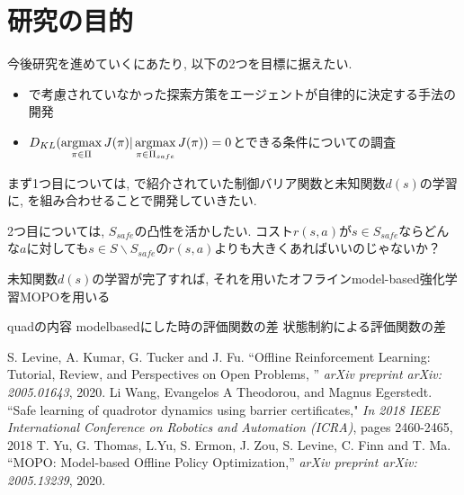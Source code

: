 \documentclass{jsarticle}
\newcommand{\argmax}{\mathop{\rm argmax}\limits}
\begin{document}
\section{研究の目的}
今後研究を進めていくにあたり, 以下の2つを目標に据えたい.
\begin{itemize}
	\item{\cite{quad}で考慮されていなかった探索方策をエージェントが自律的に決定する手法の開発}
	\item{$D_{KL}(\argmax_{\pi\in\Pi}J(\pi)|\argmax_{\pi\in\Pi_{safe}}J(\pi))=0$とできる条件についての調査}
\end{itemize}

まず1つ目については, \cite{quad}で紹介されていた制御バリア関数と未知関数$d(s)$の学習に, \cite{MOPO}を組み合わせることで開発していきたい.\par
2つ目については, $S_{safe}$の凸性を活かしたい. コスト$r(s,a)$が$s\in S_{safe}$ならどんな$a$に対しても$s\in S\backslash S_{safe}$の$r(s,a)$よりも大きくあればいいのじゃないか？\par



未知関数$d(s)$の学習が完了すれば, それを用いたオフラインmodel-based強化学習MOPOを用いる

quadの内容
modelbasedにした時の評価関数の差
状態制約による評価関数の差


\begin{thebibliography}{10}
S. Levine, A. Kumar, G. Tucker and J. Fu. “Offline Reinforcement Learning: Tutorial, Review, and Perspectives on Open Problems, ” \textit{arXiv preprint arXiv: 2005.01643}, 2020.
Li Wang, Evangelos A Theodorou, and Magnus Egerstedt. “Safe learning of quadrotor dynamics using barrier certificates," \textit{In 2018 IEEE International Conference on Robotics and Automation (ICRA)}, pages 2460-2465, 2018
T. Yu, G. Thomas, L.Yu, S. Ermon, J. Zou, S. Levine, C. Finn and T. Ma. “MOPO: Model-based Offline Policy Optimization,” \textit{arXiv preprint arXiv: 2005.13239}, 2020.


\end{thebibliography}

 
\end{document}
